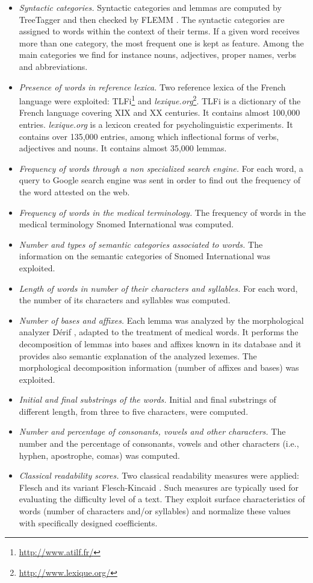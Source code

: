 \begin{itemize}
\item {\it Syntactic categories.}  Syntactic categories and lemmas are
  computed by TreeTagger \citep{Schmid-1994} and then checked by FLEMM
  \citep{Namer-TAL2000}.  The syntactic categories are assigned to
  words within the context of their terms.  If a given word receives
  more than one category, the most frequent one is kept as feature.
  Among the main categories we find for instance nouns, adjectives,
  proper names, verbs and abbreviations.
\item {\it Presence of words in reference lexica.} Two
  reference lexica of the French language were exploited:
  TLFi\footnote{\url{http://www.atilf.fr/}} and {\it lexique.org}\footnote{\url{http://www.lexique.org/}}. TLFi is
  a dictionary of the French language covering XIX and XX
  centuries. It contains almost 100,000 entries. {\it lexique.org} is
  a lexicon created for psycholinguistic experiments. It contains over
  135,000 entries, among which inflectional forms of verbs, adjectives
  and nouns. It contains almost 35,000 lemmas.
\item {\it Frequency of words through a non specialized search
    engine.} For each word, a query to Google search engine was sent in order to find out the frequency of the word attested on the web.
\item {\it Frequency of words in the medical terminology.} The frequency of words in the medical terminology Snomed International was computed.
\item {\it Number and types of semantic categories associated to
    words.} The information on the semantic categories of
  Snomed International was exploited.
\item {\it Length of words in number of their characters and
    syllables.} For each word, the number of its characters
  and syllables was computed.
\item {\it Number of bases and affixes.} Each lemma was analyzed by the
  morphological analyzer D\'erif \citep{Namer-AMIA2004}, adapted to the
  treatment of medical words. It performs the decomposition of lemmas
  into bases and affixes known in its database and it provides also
  semantic explanation of the analyzed lexemes. The
  morphological decomposition information (number of affixes and
  bases) was exploited.
\item {\it Initial and final substrings of the words.} Initial and final substrings of different length, from three to five characters, were computed.
\item {\it Number and percentage of consonants, vowels and other
    characters.} The number and the percentage of
  consonants, vowels and other characters (i.e., hyphen, apostrophe,
  comas) was computed.
\item {\it Classical readability scores.} Two classical
  readability measures were applied: Flesch \citep{Flesch1948} and its variant Flesch-Kincaid \citep{Kincaid-1975}. Such measures are typically used for evaluating the difficulty level of a text. They exploit surface
  characteristics of words (number of characters and/or syllables) and
  normalize these values with specifically designed coefficients.
\end{itemize}


